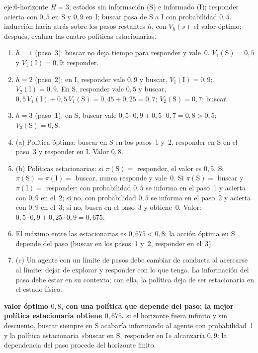 \begin{solucion}{eje:6-horizonte}
\datos $H=3$; estados sin información (S) e informado (I); responder acierta con $0{,}5$ en S y $0{,}9$ en I; buscar pasa de S a I con probabilidad $0{,}5$.
\planteamiento inducción hacia atrás sobre los pasos restantes $h$, con $V_h(s)$ el valor óptimo; después, evaluar las cuatro políticas estacionarias.
\pasos
\begin{enumerate}[label=\arabic*.]
  \item $h=1$ (paso~3): buscar no deja tiempo para responder y vale~0. $V_1(\mathrm S)=0{,}5$ y $V_1(\mathrm I)=0{,}9$: responder.
  \item $h=2$ (paso~2): en I, responder vale $0{,}9$ y buscar, $V_1(\mathrm I)=0{,}9$; $V_2(\mathrm I)=0{,}9$. En S, responder vale $0{,}5$ y buscar, $0{,}5\,V_1(\mathrm I)+0{,}5\,V_1(\mathrm S)=0{,}45+0{,}25=0{,}7$; $V_2(\mathrm S)=0{,}7$: buscar.
  \item $h=3$ (paso~1): en S, buscar vale $0{,}5\cdot 0{,}9+0{,}5\cdot 0{,}7=0{,}8>0{,}5$; $V_3(\mathrm S)=0{,}8$.
  \item (a) Política óptima: buscar en S en los pasos~1 y~2, responder en S en el paso~3 y responder en I. Valor $0{,}8$.
  \item (b) Políticas estacionarias: si $\pi(\mathrm S)=$ responder, el valor es $0{,}5$. Si $\pi(\mathrm S)=\pi(\mathrm I)=$ buscar, nunca responde y vale~0. Si $\pi(\mathrm S)=$ buscar y $\pi(\mathrm I)=$ responder: con probabilidad $0{,}5$ se informa en el paso~1 y acierta con $0{,}9$ en el~2; si no, con probabilidad $0{,}5$ se informa en el paso~2 y acierta con $0{,}9$ en el~3; si no, busca en el paso~3 y obtiene~0. Valor: $0{,}5\cdot 0{,}9+0{,}25\cdot 0{,}9=0{,}675$.
  \item El máximo entre las estacionarias es $0{,}675<0{,}8$: la acción óptima en S depende del paso (buscar en los pasos~1 y~2, responder en el~3).
  \item (c) Un agente con un límite de pasos debe cambiar de conducta al acercarse al límite: dejar de explorar y responder con lo que tenga. La información del paso debe estar en su contexto; con ella, la política deja de ser estacionaria en el estado físico.
\end{enumerate}
\resultado \textbf{valor óptimo $0{,}8$, con una política que depende del paso; la mejor política estacionaria obtiene $0{,}675$.}
\comprobacion si el horizonte fuera infinito y sin descuento, buscar siempre en S acabaría informando al agente con probabilidad~1 y la política estacionaria «buscar en S, responder en I» alcanzaría $0{,}9$: la dependencia del paso procede del horizonte finito.
\end{solucion}
